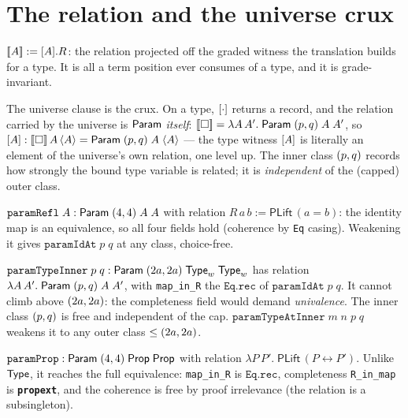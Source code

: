 \section{The relation and the universe crux}
\label{sec:universe}

\begin{definition}
  \label{def:sem}
  $[\![ A ]\!] := [ A ].R$: the relation projected off the graded witness the
  translation builds for a type. It is all a term position ever consumes of a
  type, and it is grade-invariant.
\end{definition}

The universe clause is the crux. On a type, $[ \cdot ]$ returns a record, and
the relation carried by the universe is $\mathsf{Param}$ \emph{itself}:
$[\![ \square ]\!] = \lambda A\,A'.\;\mathsf{Param}\;(p,q)\;A\;A'$, so
$[ A ] : [\![ \square ]\!]\,A\,\langle A \rangle = \mathsf{Param}\;(p,q)\;A\;\langle A \rangle$ --- the
type witness $[ A ]$ is literally an element of the universe's own relation,
one level up. The inner class $(p,q)$ records how strongly the bound type
variable is related; it is \emph{independent} of the (capped) outer class.

\begin{definition}
  \label{def:param-refl}
  \leanok
  $\texttt{paramRefl}\;A : \mathsf{Param}\;(4,4)\;A\;A$ with relation
  $R\,a\,b := \mathsf{PLift}\,(a = b)$: the identity map is an equivalence, so all
  four fields hold (coherence by \texttt{Eq} casing). Weakening it gives
  $\texttt{paramIdAt}\;p\;q$ at any class, choice-free.
\end{definition}

\begin{theorem}
  \label{thm:param-type}
  \leanok
  $\texttt{paramTypeInner}\;p\;q : \mathsf{Param}\;(2a,2a)\;\mathsf{Type}_w\;\mathsf{Type}_w$ has
  relation $\lambda A\,A'.\;\mathsf{Param}\;(p,q)\;A\;A'$, with \texttt{map\_in\_R}
  the $\texttt{Eq.rec}$ of $\texttt{paramIdAt}\;p\;q$. It cannot climb above
  $(2a,2a)$: the completeness field would demand \emph{univalence}. The
  inner class $(p,q)$ is free and independent of the cap.
  $\texttt{paramTypeAtInner}\;m\;n\;p\;q$ weakens it to any outer class
  $\leq (2a,2a)$.
\end{theorem}

\begin{theorem}
  \label{thm:param-prop}
  \leanok
  $\texttt{paramProp} : \mathsf{Param}\;(4,4)\;\mathsf{Prop}\;\mathsf{Prop}$ with relation
  $\lambda P\,P'.\;\mathsf{PLift}\,(P \leftrightarrow P')$. Unlike $\mathsf{Type}$, it
  reaches the full equivalence: \texttt{map\_in\_R} is $\texttt{Eq.rec}$,
  completeness \texttt{R\_in\_map} is \textbf{\texttt{propext}}, and the coherence
  is free by proof irrelevance (the relation is a subsingleton).
\end{theorem}

